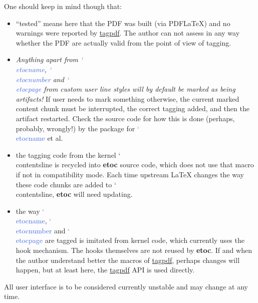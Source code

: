 \documentclass{article}
\DeclareRobustCommand\csa [1]
                {{\ttfamily\hyphenchar\font45 \char`\\ #1}}
\def\csb#1{\textcolor{RoyalBlue}{\csa{#1}}}
\newcommand\etoc{%
        \texorpdfstring{{\color{joli}\ttfamily\bfseries etoc}}{etoc}\xspace}
\DeclareRobustCommand\ctanpkg[1]
      {\texorpdfstring{\href{https://ctan.org/pkg/#1}{#1}}{#1}}
\begin{document}
\begin{itemize}
  One should keep in mind though that:
  \begin{itemize}
  \item ``tested'' means here that the PDF was built (via PDF\LaTeX) and
    no warnings were reported by \ctanpkg{tagpdf}.  The author can not
    assess in any way whether the PDF are actually valid from the point
    of view of tagging.
  \item \emph{Anything apart from \emph{\csb{etocname}},
      \emph{\csb{etocnumber}} and \emph{\csb{etocpage}} from custom user
      line styles will by default be marked as being artifacts!}  If
    user needs to mark something otherwise, the current marked content
    chunk must be interrupted, the correct tagging added, and then the
    artifact restarted. Check the source code for how this is done
    (perhaps, probably, wrongly!) by
    the package for \csb{etocname} et al.
  \item the tagging code from the kernel \csa{contentsline} is recycled
    into \etoc source code, which does not use that macro if not in
    compatibility mode.  Each time upstream \LaTeX{} changes the way
    these code chunks are added to \csa{contentsline}, \etoc will need
    updating.
  \item the way \csb{etocname}, \csb{etocnumber} and \csb{etocpage} are
    tagged is imitated from kernel code, which currently uses the hook
    mechanism.  The hooks themselves are not reused by \etoc.  If and
    when the author understand better the macros of \ctanpkg{tagpdf},
    perhaps changes will happen, but at least here, the \ctanpkg{tagpdf}
    API is used directly.
  \end{itemize}
\end{itemize}

\begingroup{}
\begin{shaded}
  All user interface is to be considered currently unstable and may change at
any time.
\end{shaded}
\endgroup
\end{document}
